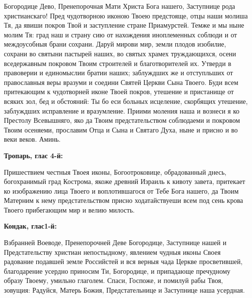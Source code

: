  


Богородице Дево, Пренепорочная Мати Христа Бога нашего, Заступнице рода христианскаго! Пред чудотворною иконою Твоею предстояще, отцы наши молиша Тя, да явиши покров Твой и заступление стране Приамурстей. Темже и мы ныне молим Тя: град наш и страну сию от нахождения иноплеменных соблюди и от междоусобныя брани сохрани. Даруй мирови мир, земли плодов изобилие, сохрани во святыни пастырей наших, во святых храмех труждающихся, осени вседержавным покровом Твоим строителей и благотворителей их. Утверди в правоверии и единомыслии братии наших; заблуждших же и отступльших от православныя веры вразуми и соедини Святей Церкви Сына Твоего. Буди всем притекающим к чудотворней  иконе Твоей покров, утешение и пристанище от всяких зол, бед и обстояний: Ты бо еси больных исцеление, скорбящих утешение, заблуждших исправление и вразумление. Приими моления наша и вознеси я ко Престолу Всевышняго, яко да Твоим предстательством соблюдаеми и покровом Твоим осеняеми, прославим Отца и Сына и Святаго Духа, ныне и присно и во веки веков. Аминь. 
\nopagebreak\bigskip\bigskip\mychapterending

 
\vspace{-\baselineskip}

\bfseries Тропарь, глас 4-й:\normalfont{}\nopagebreak


Пришествием честныя Твоея иконы, Богоотроковице, обрадованный днесь, богохранимый град Кострома, якоже древний Израиль к кивоту завета, притекает ко изображению лица Твоего и воплотившагося от Тебе Бога нашего, да Твоим Матерним к нему предстательством присно ходатайствуеши всем под сень крова Твоего прибегающим мир и велию милость.


\medskip


\bfseries Кондак, глас1-й:\normalfont{}\nopagebreak


Взбранней Воеводе, Пренепорочней Деве Богородице, Заступнице нашей и Предстательству христиан непостыдному, явлением чудныя иконы Своея радование подавшей земле Российстей и вся верныя чада Церкве просветившей, благодарение усердно приносим Ти, Богородице, и припадающе пречудному образу Твоему, умильно глаголем. Спаси, Госпоже, и помилуй рабы Твоя, зовущия: Радуйся, Матерь Божия, Предстательнице и Заступнице наша усердная.


